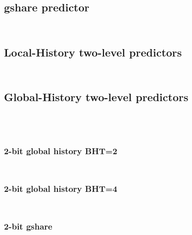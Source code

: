 \documentclass[a4paper,12pt]{article}
\begin{document}
\subsection*{gshare predictor}
\inputminted[linenos,fontsize=\scriptsize,frame=leftline]{cpp}{files/src-C1-gshare_predictor.h}
\inputminted[linenos,fontsize=\scriptsize,frame=leftline]{cpp}{files/src-C1-gshare_predictor.cpp}

\subsection*{Local-History two-level predictors}
\inputminted[linenos,fontsize=\scriptsize,frame=leftline]{cpp}{files/src-C1-localhistory_predictor.h}
\inputminted[linenos,fontsize=\scriptsize,frame=leftline]{cpp}{files/src-C1-localhistory_predictor.cpp}

\subsection*{Global-History two-level predictors}
\inputminted[linenos,fontsize=\scriptsize,frame=leftline]{cpp}{files/src-C1-globalhistory_predictor.h}
\inputminted[linenos,fontsize=\scriptsize,frame=leftline]{cpp}{files/src-C1-globalhistory_predictor.cpp}


\inputminted[linenos,fontsize=\scriptsize,frame=leftline]{cpp}{files/src-C2-hybrid_predictor.h}
\inputminted[linenos,fontsize=\scriptsize,frame=leftline]{cpp}{files/src-C2-hybrid_predictor.cpp}

\subsubsection*{2-bit global history BHT=2}
\inputminted[linenos,fontsize=\scriptsize,frame=leftline]{cpp}{files/src-C2-hybrid_2bit_GH2_predictor.cpp}
\inputminted[linenos,fontsize=\scriptsize,frame=leftline]{cpp}{files/src-C2-hybrid_2bit_GH2_predictor.h}

\subsubsection*{2-bit global history BHT=4}
\inputminted[linenos,fontsize=\scriptsize,frame=leftline]{cpp}{files/src-C2-hybrid_2bit_GH4_predictor.cpp}
\inputminted[linenos,fontsize=\scriptsize,frame=leftline]{cpp}{files/src-C2-hybrid_2bit_GH4_predictor.h}

\subsubsection*{2-bit gshare}
\inputminted[linenos,fontsize=\scriptsize,frame=leftline]{cpp}{files/src-C2-hybrid_2bit_GS_predictor.cpp}
\inputminted[linenos,fontsize=\scriptsize,frame=leftline]{cpp}{files/src-C2-hybrid_2bit_GS_predictor.h}
\end{document}
